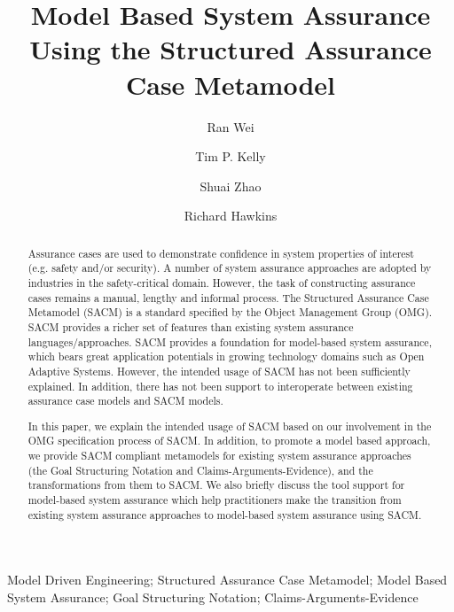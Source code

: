 \documentclass[preprint,11pt,authoryear]{elsarticle}
\begin{document}
	\begin{frontmatter}
		
		\title{Model Based System Assurance Using the Structured Assurance Case Metamodel}
		
		\author[york]{Ran Wei}
		
		\author[york]{Tim P. Kelly}
		
		\author[york]{Shuai Zhao}
		
		\author[york]{Richard Hawkins}

		
		\address[york]{Department of Computer Science, University of York, York, YO10 5GH, UK}
		

\begin{abstract}
Assurance cases are used to demonstrate confidence in system properties of interest (e.g. safety and/or security).
A number of system assurance approaches are adopted by industries in the safety-critical domain.
However, the task of constructing assurance cases remains a manual, lengthy and informal process. 
The Structured Assurance Case Metamodel (SACM) is a standard specified by the Object Management Group (OMG). 
SACM provides a richer set of features than existing system assurance languages/approaches.
SACM provides a foundation for model-based system assurance, which bears great application potentials in growing technology domains such as Open Adaptive Systems.
However, the intended usage of SACM has not been sufficiently explained. 
In addition, there has not been support to interoperate between existing assurance case models and SACM models.

In this paper, we explain the intended usage of SACM based on our involvement in the OMG specification process of SACM.
In addition, to promote a model based approach, we provide SACM compliant metamodels for existing system assurance approaches (the Goal Structuring Notation and Claims-Arguments-Evidence), and the transformations from them to SACM. 
We also briefly discuss the tool support for model-based system assurance which help practitioners make the transition from existing system assurance approaches to model-based system assurance using SACM.

\end{abstract}
\begin{keyword}
Model Driven Engineering; Structured Assurance Case Metamodel; Model Based System Assurance; Goal Structuring Notation; Claims-Arguments-Evidence
\end{keyword}

\end{frontmatter}
\end{document}
